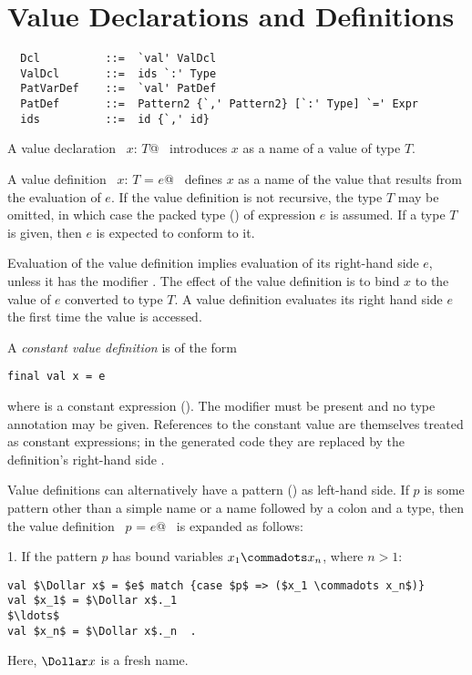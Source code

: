\section{Value Declarations and Definitions}
\label{sec:valdef}

\syntax\begin{lstlisting}
  Dcl          ::=  `val' ValDcl
  ValDcl       ::=  ids `:' Type
  PatVarDef    ::=  `val' PatDef 
  PatDef       ::=  Pattern2 {`,' Pattern2} [`:' Type] `=' Expr
  ids          ::=  id {`,' id}
\end{lstlisting}

A value declaration ~\lstinline@val $x$: $T$@~ introduces $x$ as a name of a value of
type $T$.  

A value definition ~\lstinline@val $x$: $T$ = $e$@~ defines $x$ as a
name of the value that results from the evaluation of $e$. 
If the value definition is not recursive, the type
$T$ may be omitted, in which case the packed type () of expression $e$ is
assumed.  If a type $T$ is given, then $e$ is expected to conform to
it.

Evaluation of the value definition implies evaluation of its
right-hand side $e$, unless it has the modifier \lstinline@lazy@.  The
effect of the value definition is to bind $x$ to the value of $e$
converted to type $T$. A \lstinline@lazy@ value definition evaluates
its right hand side $e$ the first time the value is accessed.

A {\em constant value definition} is of the form
\begin{lstlisting}
final val x = e
\end{lstlisting}
where \lstinline@e@ is a constant expression
(). 
The \lstinline@final@ modifier must be
present and no type annotation may be given. References to the
constant value \lstinline@x@ are themselves treated as constant expressions; in the
generated code they are replaced by the definition's right-hand side \lstinline@e@.

Value definitions can alternatively have a pattern
() as left-hand side.  If $p$ is some pattern other
than a simple name or a name followed by a colon and a type, then the
value definition ~\lstinline@val $p$ = $e$@~ is expanded as follows:

1. If the pattern $p$ has bound variables $x_1 \commadots x_n$, where $n > 1$:
\begin{lstlisting}
val $\Dollar x$ = $e$ match {case $p$ => ($x_1 \commadots x_n$)}
val $x_1$ = $\Dollar x$._1
$\ldots$
val $x_n$ = $\Dollar x$._n  .
\end{lstlisting}
Here, $\Dollar x$ is a fresh name.  

